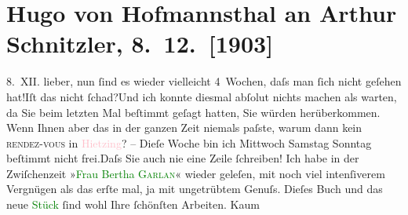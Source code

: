 

               \section[Hugo von Hofmannsthal an Arthur Schnitzler, 8. 12. {[}1903{]}]{ Hugo von Hofmannsthal an Arthur Schnitzler, 8. 12. {[}1903{]}}\nopagebreak{}\rehead{ }\normalsize\beginnumbering{} \toendnotes[C]{\smallbreak\pagebreak[2]} 
\toendnotes[C]{\smallbreak}\pstart
           \raggedleft{}{\pb}8. XII.\pend
           \pstart{}lieber,\pend\pstart
           nun ſind es wieder vielleicht 4 Wochen, daſs man ſich nicht geſehen hat!\hspace*{1em}Iſt das nicht ſchad?\hspace*{1.5em}Und ich konnte diesmal abſolut nichts machen als warten, da Sie beim letzten Mal
               beſtimmt geſagt hatten, Sie würden herüberkommen. Wenn Ihnen aber das in der ganzen
                  {\pb}Zeit niemals paſste, warum
               dann kein \textsc{rendez-vous} in \textcolor{pink}{Hietzing}{}\ledrightnote{\textcolor{pink}{XIII., Hietzing}}? –\pend
           \pstart
           Dieſe Woche bin ich Mittwoch Samstag Sonntag beſtimmt nicht frei.\hspace*{1.5em}Daſs Sie auch nie eine Zeile ſchreiben! \pend
           \pstart
           Ich habe in der Zwiſchenzeit »\textcolor{green}{Frau Bertha \textsc{Garlan}}{}\ledrightnote{\textcolor{green}{Frau Bertha Garlan. Roman}}« wieder geleſen, mit noch viel {\pb}intenſiverem Vergnügen als das
               erſte mal, ja mit ungetrübtem Genuſs. Dieſes Buch und das neue \textcolor{green}{Stück}{} ſind wohl Ihre ſchönſten Arbeiten. Kaum

